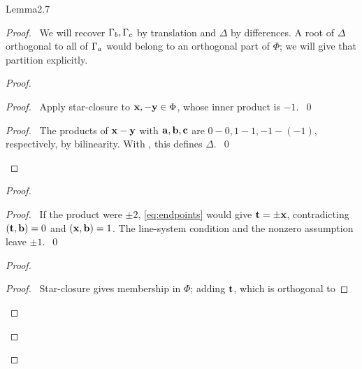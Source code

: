 \begin{cgss}{Lemma}{2.7}\label{lem:2.7}
\end{cgss}
\begin{proof}
 \pfsketch\ We will recover $\Gamma_b,\Gamma_c$ by translation and $\Delta$ by differences.
 A root of $\Delta$ orthogonal to all of $\Gamma_a$ would belong to an orthogonal part of $\Phi$;
 we will give that partition explicitly.
 \begin{proof}
  \begin{proof}\pf\ Apply star-closure to ${\mathbf x},-{\mathbf y}\in\Phi$, whose inner product is $-1$.~\qed\end{proof}
  \qedstep
  \begin{proof}
   \pf\ The products of ${\mathbf x}-{\mathbf y}$ with ${\mathbf a},{\mathbf b},{\mathbf c}$ are
   $0-0,1-1,-1-(-1)$, respectively, by bilinearity. With , this defines $\Delta$.~\qed
  \end{proof}
 \end{proof}
 \begin{proof}
  \begin{proof}
   \pf\ If the product were $\pm2$, \eqref{eq:endpoints} would give
   ${\mathbf t}=\pm{\mathbf x}$, contradicting $({\mathbf t},{\mathbf b})=0$ and $({\mathbf x},{\mathbf b})=1$.
   The line-system condition and the nonzero assumption leave $\pm1$.~\qed
  \end{proof}
  \begin{proof}
   \begin{proof}
    \pf\ Star-closure gives membership in $\Phi$; adding ${\mathbf t}$, which is orthogonal to

\end{proof}
\end{proof}
\end{proof}
\end{proof}
